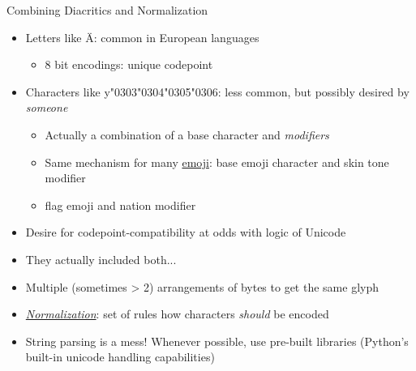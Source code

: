 
\begin{frame}[fragile]{Combining Diacritics and Normalization}
%
\begin{itemize}
\item Letters like Ä: common in European languages
	\begin{itemize}
	\item 8 bit encodings: unique codepoint
	\end{itemize}
\item Characters like {\DejaSans y\char"0303\char"0304\char"0305\char"0306}: less common, but possibly desired by \emph{someone}
	\begin{itemize}
	\item Actually a combination of a base character and \emph{modifiers}
	\item Same mechanism for many {\color{blue} \href{https://xkcd.com/1813/}{emoji}}: base emoji character and skin tone modifier
	\item flag emoji and nation modifier
	\end{itemize}
\item[\Thus] Desire for codepoint-compatibility at odds with logic of Unicode
\item[\Thus] They actually included both...
\item Multiple (sometimes > 2) arrangements of bytes to get the same glyph
\item[\Thus] {\color{blue} \href{https://unicode.org/reports/tr15/}{\emph{Normalization}}}: set of rules how characters \emph{should} be encoded
\item[\Thus] String parsing is a mess! Whenever possible, use pre-built libraries (\ie Python's built-in unicode handling capabilities)
\end{itemize}
%
\end{frame}


